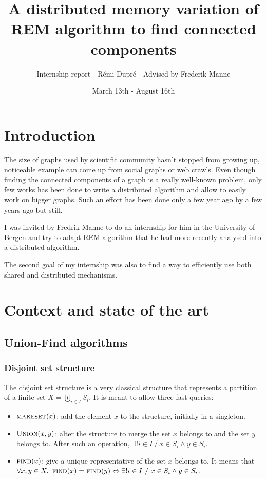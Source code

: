 \documentclass[12px]{article}
\title{A distributed memory variation of REM algorithm to find connected components}
\author{Internship report - Rémi Dupré - Advised by Frederik Manne}
\date{March 13th - August 16th}
\begin{document}
  \maketitle
  \pagebreak

  \tableofcontents
  \pagebreak

  \section{Introduction}
    The size of graphs used by scientific community hasn't stopped from growing up, noticeable example can come up from social graphs or web crawls.
    Even though finding the connected components of a graph is a really well-known problem, only few works has been done to write a distributed algorithm and allow to easily work on bigger graphs.
    Such an effort has been done only a few year ago by  a few years ago but still.

    I was invited by Fredrik Manne to do an internship for him in the University of Bergen and try to adapt REM algorithm that he had more recently analysed into a distributed algorithm.

    The second goal of my internship was also to find a way to efficiently use both shared and distributed mechanisms.


  \section{Context and state of the art}
    \subsection{Union-Find algorithms}
      \subsubsection{Disjoint set structure}
        The disjoint set structure is a very classical structure that represents a partition of a finite set $X = \biguplus\limits_{i \in I} S_i$. It is meant to allow three fast queries:
        \begin{itemize}
          \item $\Call{makeset}{x}$: add the element $x$ to the structure, initially in a singleton.
          \item $\Call{Union}{x, y}$: alter the structure to merge the set $x$ belongs to and the set $y$ belongs to. After such an operation, $\exists! i \in I~/~x \in S_i \land y \in S_i$.
          \item $\Call{find}{x}$: give a unique representative of the set $x$ belongs to. It means that $\forall x, y \in X,~\Call{find}{x} = \Call{find}{y} \Leftrightarrow \exists! i \in I~/~x \in S_i \land y \in S_i$.
        \end{itemize}
\end{document}
